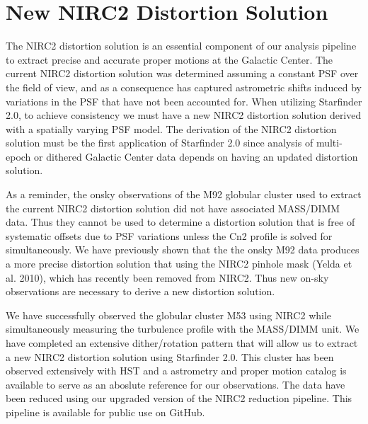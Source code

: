 \section{New NIRC2 Distortion Solution}
\label{sec:distortion}

The NIRC2 distortion solution is an essential component of our analysis pipeline to extract precise and accurate proper motions at the Galactic Center. The current NIRC2 distortion solution was determined assuming a constant PSF over the field of view, and as a consequence has captured astrometric shifts induced by variations in the PSF that have not been accounted for. When utilizing Starfinder 2.0, to achieve consistency we m​ust h​ave a new NIRC2 distortion solution derived with a spatially varying PSF model. The derivation of the NIRC2 distortion solution must be the first application of Starfinder 2.0 since analysis of multi-epoch or dithered Galactic Center data depends on having an updated distortion solution.

As a reminder, the on­sky observations of the M92 globular cluster used to extract the current NIRC2 distortion solution did not have associated MASS/DIMM data. Thus they cannot be used to determine a distortion solution that is free of systematic offsets due to PSF variations unless the Cn2 profile is solved for simultaneously. We have previously shown that the the on­sky M92 data produces a more precise distortion solution that using the NIRC2 pinhole mask (Yelda et al. 2010), which has recently been removed from NIRC2. 
Thus new on-sky observations are necessary to derive a new distortion solution. 

We have successfully observed the globular cluster M53 using NIRC2
while simultaneously measuring the turbulence profile with the
MASS/DIMM unit. We have completed an extensive dither/rotation pattern
that will allow us to extract a new NIRC2 distortion solution using
Starfinder 2.0. This cluster has been observed extensively with HST and a astrometry and proper motion catalog is available to serve as an aboslute reference for our observations. 
The data have been reduced using our upgraded version of the NIRC2 reduction pipeline.
This pipeline is available for public use on GitHub. 


